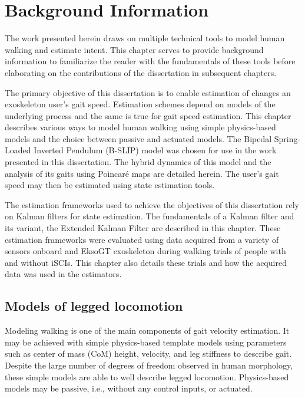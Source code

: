 \chapter{Background Information}\label{chapter:bg_info}

The work presented herein draws on multiple technical tools to model human walking and estimate intent. This chapter serves to provide background information to familiarize the reader with the fundamentals of these tools before elaborating on the contributions of the dissertation in subsequent chapters. 

The primary objective of this dissertation is to enable estimation of changes an exoskeleton user's gait speed. Estimation schemes depend on models of the underlying process and the same is true for gait speed estimation. This chapter describes various ways to model human walking using simple physics-based models and the choice between passive and actuated models. The Bipedal Spring-Loaded Inverted Pendulum (B-SLIP) model was chosen for use in the work presented in this dissertation. The hybrid dynamics of this model and the analysis of its gaits using Poincar\'e maps are detailed herein. The user's gait speed may then be estimated using state estimation tools.

The estimation frameworks used to achieve the objectives of this dissertation rely on Kalman filters for state estimation. The fundamentals of a Kalman filter and its variant, the Extended Kalman Filter are described in this chapter. These estimation frameworks were evaluated using data acquired from a variety of sensors onboard and EksoGT exoskeleton during walking trials of people with and without iSCIs. This chapter also details these trials and how the acquired data was used in the estimators.

\section{Models of legged locomotion}

Modeling walking is one of the main components of gait velocity estimation. It may be achieved with simple physics-based template models using parameters such as center of mass (CoM) height, velocity, and leg stiffness to describe gait. Despite the large number of degrees of freedom observed in human morphology, these simple models are able to well describe legged locomotion. Physics-based models may be passive, i.e., without any control inputs, or actuated.  

